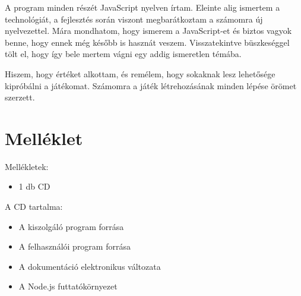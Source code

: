 \documentclass[bibliography=totocnumbered]{article}
\begin{document}
A program minden részét JavaScript nyelven írtam. Eleinte alig ismertem
a technológiát, a fejlesztés során viszont megbarátkoztam a számomra új
nyelvezettel. Mára mondhatom, hogy ismerem a JavaScript-et és biztos
vagyok benne, hogy ennek még később is hasznát veszem. Visszatekintve
büszkeséggel tölt el, hogy így bele mertem vágni egy addig ismeretlen
témába.

Hiszem, hogy értéket alkottam, és remélem, hogy sokaknak lesz lehetősége
kipróbálni a játékomat. Számomra a játék létrehozásának minden lépése
örömet szerzett.


\nocite{*}

\let\oldsection\section
\let\Section\section 
\def\section*#1{\Section{#1}} 


\printindex
\renewcommand{\section}[1]{\oldsection{#1}}

\section{Melléklet}

Mellékletek:

\begin{itemize}
\item
  1 db CD
\end{itemize}

A CD tartalma:

\begin{itemize}
\item
  A kiszolgáló program forrása
\item
  A felhasználói program forrása
\item
  A dokumentáció elektronikus változata
\item
  A Node.js futtatókörnyezet
\end{itemize}
\end{document}
